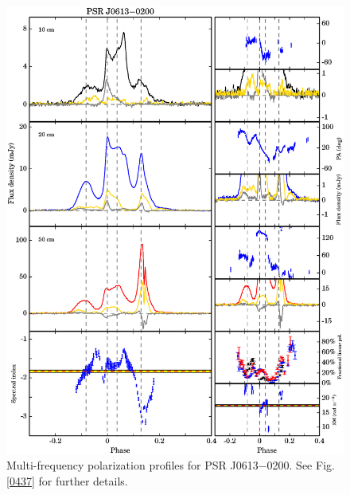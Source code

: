 \documentclass[useAMS,usenatbib]{mn2e}
\begin{document}
\begin{appendix}
\begin{figure}
\begin{center}
\includegraphics[width=6 in]{0613.ps}
\caption{Multi-frequency polarization profiles for PSR J0613$-$0200. 
See Fig. \ref{0437} for further details.}
\label{0613}
\end{center}
\end{figure}


\end{appendix}
\end{document}
